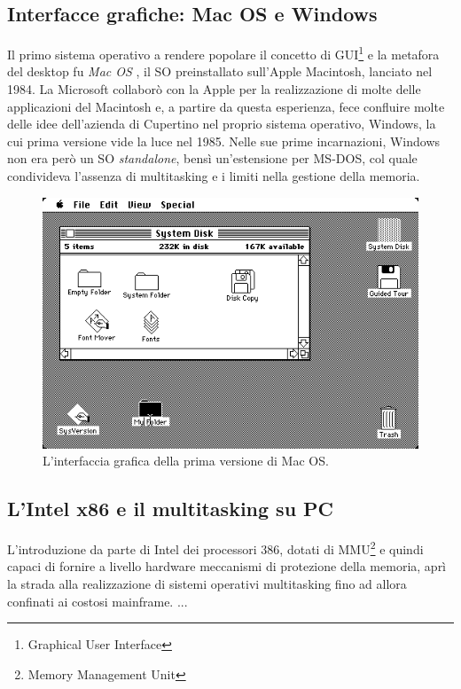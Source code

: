 \documentclass[12pt,a4paper]{report}
\begin{document}
		\subsection{Interfacce grafiche: Mac OS e Windows}
			Il primo sistema operativo a rendere popolare il concetto di GUI\footnote{Graphical User Interface} e la metafora del desktop
			fu \emph{Mac OS} \cite{WIKI_MacHistory}, il SO preinstallato sull'Apple Macintosh, lanciato nel 1984.
			La Microsoft collaborò con la Apple per la realizzazione di molte delle applicazioni del Macintosh e, a partire da questa
			esperienza, fece confluire molte delle idee dell'azienda di Cupertino nel proprio sistema operativo, Windows, la cui
			prima versione vide la luce nel 1985.
			Nelle sue prime incarnazioni, Windows non era però un SO \emph{standalone}, bensì un'estensione per MS-DOS,
			col quale condivideva l'assenza di multitasking e i limiti nella gestione della memoria.
	
			\begin{figure}[htbp]
			\centering
			\includegraphics[scale=0.6]{img/macos.png}
			\caption{L'interfaccia grafica della prima versione di Mac OS.\label{fig:macos}}
			\end{figure}
			
		\subsection{L'Intel x86 e il multitasking su PC}
			L'introduzione da parte di Intel dei processori 386, dotati di MMU\footnote{Memory Management Unit} e quindi capaci di fornire a
			livello hardware meccanismi di protezione della memoria, aprì la strada alla realizzazione di sistemi operativi multitasking
			fino ad allora confinati ai costosi mainframe.
			...
\end{document}
